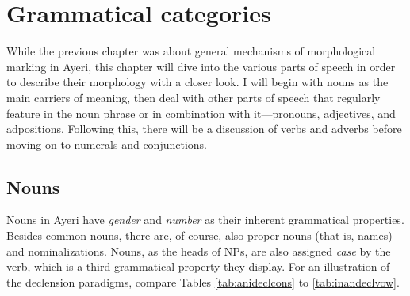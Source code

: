 \chapter{Grammatical categories}
\label{ch:gramcat}

While the previous chapter was about general mechanisms of morphological
marking in Ayeri, this chapter will dive into the various parts of speech in
order to describe their morphology with a closer look. I will begin with nouns
as the main carriers of meaning, then deal with other parts of speech that
regularly feature in the noun phrase or in combination with it---pronouns,
adjectives, and adpositions. Following this, there will be a discussion of
verbs and adverbs before moving on to numerals and conjunctions.

\section{Nouns}
\label{sec:nouns}

Nouns in Ayeri have \emph{gender} and \emph{number} as their inherent
grammatical properties. Besides common nouns, there are, of course, also proper
nouns (that is, names) and nominalizations. Nouns, as the heads of NPs, are
also assigned \emph{case} by the verb, which is a third grammatical property
they display. For an illustration of the declension paradigms, compare Tables
\ref{tab:anideclcons} to \ref{tab:inandeclvow}.

